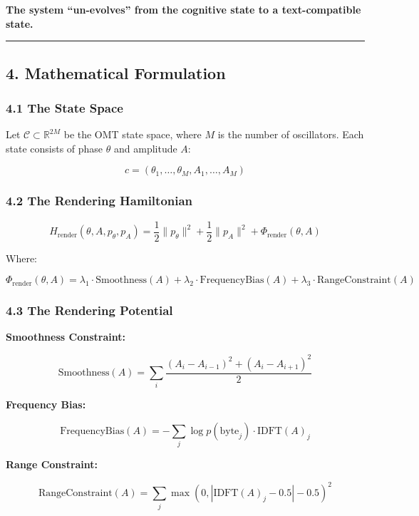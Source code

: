 \documentclass[
  11pt,
  a4paper,
]{article}
\begin{document}
\textbf{The system ``un-evolves'' from the cognitive state to a
text-compatible state.}

\begin{center}\rule{0.5\linewidth}{0.5pt}\end{center}

\subsection{4. Mathematical Formulation}\label{mathematical-formulation}

\subsubsection{4.1 The State Space}\label{the-state-space}

Let \(\mathcal{C} \subset \mathbb{R}^{2M}\) be the OMT state space,
where \(M\) is the number of oscillators. Each state consists of phase
\(\theta\) and amplitude \(A\):

\[
c = (\theta_1, \dots, \theta_M, A_1, \dots, A_M)
\]

\subsubsection{4.2 The Rendering
Hamiltonian}\label{the-rendering-hamiltonian-1}

\[
H_{\text{render}}(\theta, A, p_\theta, p_A) = \frac{1}{2} \|p_\theta\|^2 + \frac{1}{2} \|p_A\|^2 + \Phi_{\text{render}}(\theta, A)
\]

Where:

\[
\Phi_{\text{render}}(\theta, A) = \lambda_1 \cdot \text{Smoothness}(A) + \lambda_2 \cdot \text{FrequencyBias}(A) + \lambda_3 \cdot \text{RangeConstraint}(A)
\]

\subsubsection{4.3 The Rendering
Potential}\label{the-rendering-potential-1}

\textbf{Smoothness Constraint:}

\[
\text{Smoothness}(A) = \sum_i \frac{(A_i - A_{i-1})^2 + (A_i - A_{i+1})^2}{2}
\]

\textbf{Frequency Bias:}

\[
\text{FrequencyBias}(A) = -\sum_j \log p(\text{byte}_j) \cdot \text{IDFT}(A)_j
\]

\textbf{Range Constraint:}

\[
\text{RangeConstraint}(A) = \sum_j \max(0, |\text{IDFT}(A)_j - 0.5| - 0.5)^2
\]
\end{document}
